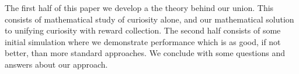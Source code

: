 The first half of this paper we develop a the theory behind our union. This consists of mathematical study of curiosity alone, and our mathematical solution to unifying curiosity with reward collection. The second half consists of some initial simulation where we demonstrate performance which is as good, if not better, than more standard approaches. We conclude with some questions and answers about our approach.
